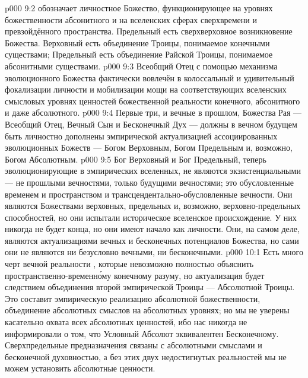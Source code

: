 \vs p000 9:2 \pc {} обозначает личностное Божество, функционирующее на уровнях божественности абсонитного и на вселенских сферах сверхвремени и превзойдённого пространства. Предельный есть сверхверховное возникновение Божества. Верховный есть объединение Троицы, понимаемое конечными существами; Предельный есть объединение Райской Троицы, понимаемое абсонитными существами.
\vs p000 9:3 Всеобщий Отец с помощью механизма эволюционного Божества фактически вовлечён в колоссальный и удивительный  фокализации личности и мобилизации мощи на соответствующих вселенских смысловых уровнях ценностей божественной реальности конечного, абсонитного и даже абсолютного.
\vs p000 9:4 Первые три, и вечные в прошлом, Божества Рая --- Всеобщий Отец, Вечный Сын и Бесконечный Дух --- должны в вечном будущем быть личностно дополнены эмпирической актуализацией ассоциированных эволюционных Божеств --- Богом Верховным, Богом Предельным и, возможно, Богом Абсолютным.
\vs p000 9:5 \pc Бог Верховный и Бог Предельный, теперь эволюционирующие в эмпирических вселенных, не являются экзистенциальными --- не прошлыми вечностями, только будущими вечностями; это обусловленные временем и пространством и трансцендентально\hyp{}обусловленные вечности. Они являются Божествами верховных, предельных и, возможно, верховно\hyp{}предельных способностей, но они испытали историческое вселенское происхождение. У них никогда не будет конца, но они имеют начало как личности. Они, на самом деле, являются актуализациями вечных и бесконечных потенциалов Божества, но сами они не являются ни безусловно вечными, ни бесконечными.
\vs p000 10:1 Есть много черт вечной реальности , которые невозможно полностью объяснить пространственно\hyp{}временн\'ому конечному разуму, но актуализация  будет следствием объединения второй эмпирической Троицы --- Абсолютной Троицы. Это составит эмпирическую реализацию абсолютной божественности, объединение абсолютных смыслов на абсолютных уровнях; но мы не уверены касательно охвата всех абсолютных ценностей, ибо нас никогда не информировали о том, что Условный Абсолют эквивалентен Бесконечному. Сверхпредельные предназначения связаны с абсолютными смыслами и бесконечной духовностью, а без этих двух недостигнутых реальностей мы не можем установить абсолютные ценности.
